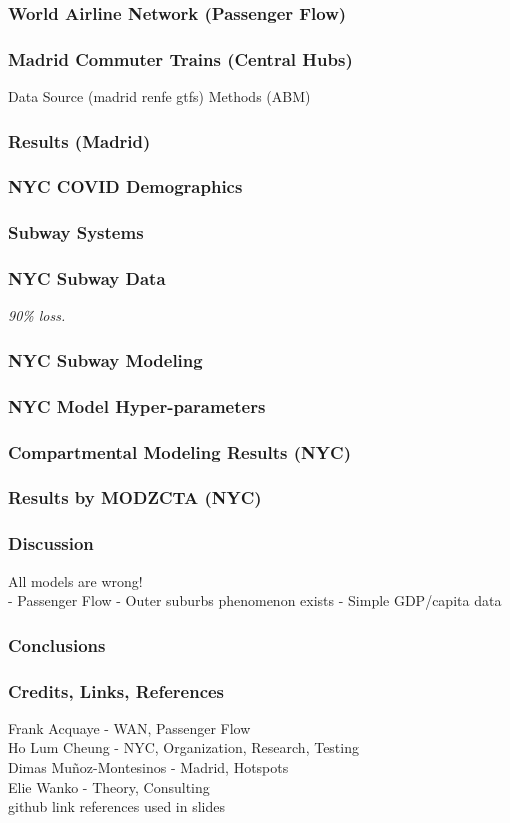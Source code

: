 \documentclass{beamer}
\begin{document}
\begin{frame}
\begin{frame}
\end{frame}
\begin{frame}
\frametitle{World Airline Network (Passenger Flow)}
\end{frame}
\begin{frame}
\frametitle{Madrid Commuter Trains (Central Hubs)}
Data Source (madrid renfe gtfs)
Methods (ABM)
\end{frame}
\begin{frame}
\frametitle{Results (Madrid)}
\end{frame}
\begin{frame}
\frametitle{NYC COVID Demographics}
\end{frame}
\begin{frame}
\frametitle{Subway Systems}
\end{frame}
\begin{frame}
\frametitle{NYC Subway Data}
\textit{90\% loss.}
\end{frame}
\begin{frame}
\frametitle{NYC Subway Modeling}
\end{frame}
\begin{frame}
\frametitle{NYC Model Hyper-parameters}
\end{frame}
\begin{frame}
\frametitle{Compartmental Modeling Results (NYC)}
\end{frame}
\begin{frame}
\frametitle{Results by MODZCTA (NYC)}
\end{frame}
\begin{frame}
\frametitle{Discussion}
All models are wrong!\\
- Passenger Flow
- Outer suburbs phenomenon exists
- Simple GDP/capita data
\end{frame}
\begin{frame}
\frametitle{Conclusions}
\end{frame}
\begin{frame}
\frametitle{Credits, Links, References}
Frank Acquaye - WAN, Passenger Flow\\
Ho Lum Cheung - NYC, Organization, Research, Testing\\
Dimas Muñoz-Montesinos - Madrid, Hotspots\\
Elie Wanko - Theory, Consulting\\
github link
references used in slides
{}

\end{frame}
\end{document}
